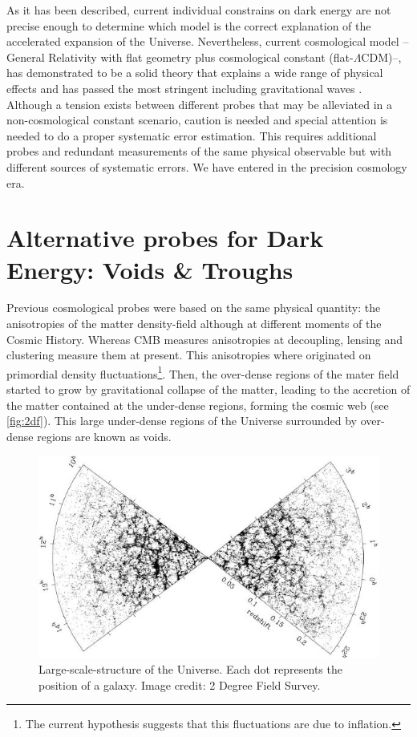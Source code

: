 As it has been described, current individual constrains on dark energy are not precise enough to determine which model is the correct explanation of the accelerated expansion of the Universe. Nevertheless, current cosmological model --General Relativity with flat geometry plus cosmological constant (flat-$\Lambda$CDM)--, has demonstrated to be a solid theory that explains a wide range of physical effects and has passed the most stringent including gravitational waves \cite{1982ApJ...253..908T,PhysRevLett.116.061102}. Although a tension exists between different probes that may be alleviated in a  non-cosmological constant scenario, caution is needed and special attention is needed to do a proper systematic error estimation. This requires additional probes and redundant measurements of the same physical observable but with different sources of systematic errors. We have entered in the precision cosmology era.


\section{Alternative probes for Dark Energy: Voids \& Troughs}
Previous cosmological probes were based on the same physical quantity: the anisotropies of the matter density-field although at different moments of the Cosmic History. Whereas CMB measures anisotropies at decoupling, lensing and clustering measure them at present. This anisotropies where originated on primordial density fluctuations\footnote{The current hypothesis suggests that this fluctuations are due to inflation.}. Then, the over-dense regions of the mater field started to grow by gravitational collapse of the matter, leading to the accretion of the matter contained at the under-dense regions, forming the cosmic  web (see \autoref{fig:2df}). This large under-dense regions of the Universe surrounded by over-dense regions are known as voids.
\begin{figure}
\includegraphics[width=\textwidth]{./Pictures/2df.jpg}
\caption{Large-scale-structure of the Universe. Each dot represents the position of a galaxy. Image credit: 2 Degree Field Survey.}
\label{fig:2df}
\end{figure}
\newline

